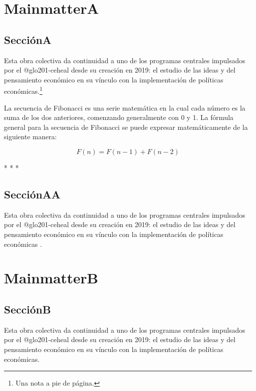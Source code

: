 \mainmatter

\chapter{MainmatterA}

\section{SecciónA}

Esta obra colectiva da continuidad a uno de los programas centrales impulsados por el \gls{@glo201-ceheal} desde su creación en 2019: el estudio de las ideas y del pensamiento económico en su vínculo con la implementación de políticas económicas.\footnote{Una nota a pie de página.}

La secuencia de Fibonacci es una serie matemática en la cual cada número es la suma de los dos anteriores, comenzando generalmente con 0 y 1. La fórmula general para la secuencia de Fibonacci se puede expresar matemáticamente de la siguiente manera:

$$F(n) = F(n-1) + F(n-2)$$

\ifPDF
\froufrou
\else
	\ifBNPDF
	\froufrou
	\else
		\ifODT
		\begin{center} * * * \end{center}
		\fi
	\fi
\fi

\section{SecciónAA}

Esta obra colectiva da continuidad a uno de los programas centrales impulsados por el \gls{@glo201-ceheal} desde su creación en 2019: el estudio de las ideas y del pensamiento económico en su vínculo con la implementación de políticas económicas \parencite{@940-SHUMWAY1999}.

\chapter{MainmatterB}

\section{SecciónB}

Esta obra colectiva da continuidad a uno de los programas centrales impulsados por el \gls{@glo201-ceheal} desde su creación en 2019: el estudio de las ideas y del pensamiento económico en su vínculo con la implementación de políticas económicas.

